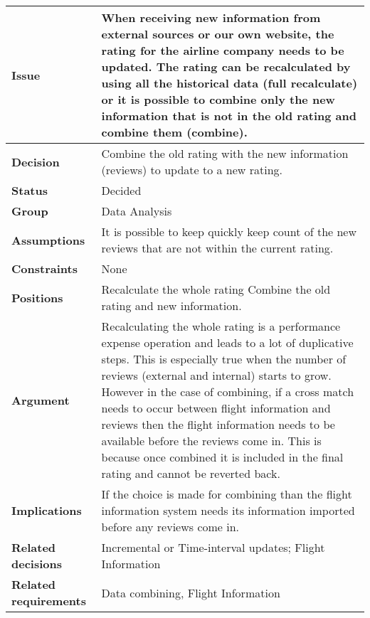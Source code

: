 
\label{dd:recalc-comb}
\begin{tabular}{ l  p{10cm}}
\hline
\bf Issue & When receiving new information from external sources or our own website, the rating for the airline company needs to be updated. The rating can be recalculated by using all the historical data (full recalculate) or it is possible to combine only the new information that is not in the old rating and combine them (combine). \\
\hline
\bf Decision & Combine the old rating with the new information (reviews) to update to a new rating. \\
\hline
\bf Status & Decided \\
\hline
\bf Group & Data Analysis \\
\hline
\bf Assumptions & It is possible to keep quickly keep count of the new reviews that are not within the current rating. \\
\hline
\bf Constraints & None \\
\hline
\bf Positions & Recalculate the whole rating \newline\newline
Combine the old rating and new information. \\
\hline
\bf Argument & Recalculating the whole rating is a performance expense operation and leads to a lot of duplicative steps. This is especially true when the number of reviews (external and internal) starts to grow. However in the case of combining, if a cross match needs to occur between flight information and reviews then the flight information needs to be available before the reviews come in. This is because once combined it is included in the final rating and cannot be reverted back. \\
\hline
\bf Implications & If the choice is made for combining than the flight information system needs its information imported before any reviews come in. \\
\hline
\bf Related decisions & Incremental or Time-interval updates; Flight Information \\
\hline
\bf Related requirements  & Data combining, Flight Information \\
\hline
\end{tabular}
